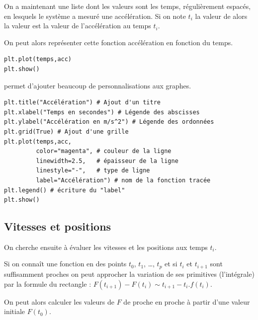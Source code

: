 On a maintenant une liste dont les valeurs sont les temps, régulièrement espacés, en lesquels le système a mesuré une accélération. Si on note $t_i$ la valeur de  alors la valeur  est la valeur de l'accélération au temps $t_i$.

On peut alors représenter cette fonction accélération en fonction du temps.
\begin{lstlisting}
plt.plot(temps,acc)
plt.show()
\end{lstlisting}
 permet d'ajouter beaucoup de personnalisations aux graphes.
\begin{lstlisting}
plt.title("Accélération") # Ajout d'un titre 		
plt.xlabel("Temps en secondes") # Légende des abscisses		
plt.ylabel("Accélération en m/s^2") # Légende des ordonnées			
plt.grid(True) # Ajout d'une grille 
plt.plot(temps,acc,
         color="magenta", # couleur de la ligne
         linewidth=2.5,   # épaisseur de la ligne
         linestyle="-",   # type de ligne
         label="Accélération") # nom de la fonction tracée
plt.legend() # écriture du "label"
plt.show()
\end{lstlisting}
\subsection{Vitesses et positions}
On cherche ensuite à évaluer les vitesses et les positions aux temps $t_i$.

Si on connaît une fonction en des points $t_0$, $t_1$, \dots, $t_p$ et si $t_i$ et $t_{i+1}$ sont suffisamment proches on peut approcher la variation de ses primitives (l'intégrale) par la formule du rectangle : $\displaystyle F(t_{i+1}) - F(t_i)\sim {t_{i+1} - t_i}. f(t_i)$.

On peut alors calculer les valeurs de $F$ de proche en proche à partir d'une valeur initiale $F(t_0)$.

